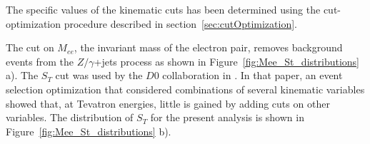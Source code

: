 The specific values of the kinematic cuts has been determined using the cut-optimization procedure
described in section~\ref{sec:cutOptimization}.

The cut on $M_{ee}$, the invariant mass of the electron pair, 
removes background events from the
$Z/\gamma$+jets process as shown in Figure~\ref{fig:Mee_St_distributions} a).
The $S_T$ cut was used by the $D0$ collaboration in 
\cite{Abazov:2001mx}. In that paper, an event 
selection optimization that considered
combinations of several kinematic variables 
showed that, at Tevatron energies,  little is gained by 
adding cuts on other variables. The distribution of $S_T$ for the present
analysis is shown in Figure~\ref{fig:Mee_St_distributions} b).

